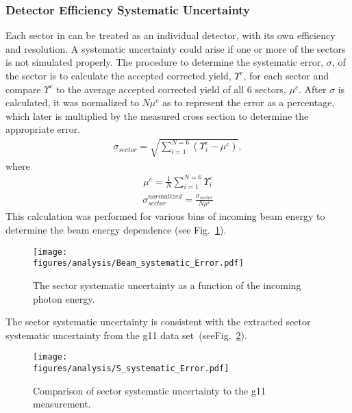 \subsubsection{Detector Efficiency Systematic Uncertainty}
Each sector in  can be treated as an individual detector, with its own efficiency and resolution. A systematic uncertainty could arise if one or more of the sectors is not simulated properly. The procedure to determine the systematic error, $\sigma$, of the sector is to calculate the accepted corrected yield, $\Upsilon^c$, for each sector and compare $\Upsilon^c$ to the average accepted corrected yield of all 6 sectors, $\mu^c$. After $\sigma$ is calculated, it was normalized to $N \mu^c$ as to represent the error as a percentage, which later is multiplied by the measured cross section to determine the appropriate error. 
\begin{align}
\sigma_{sector} = \sqrt{\sum_{i=1}^{N = 6}\left(\Upsilon_i^c - \mu^c\right)},
\end{align}
where
\begin{align}
\mu^c = \frac{1}{N}\sum_{i=1}^{N=6}\Upsilon_i^c
\end{align}
\begin{align}
\sigma_{sector}^{normalized} = \frac{\sigma_{sector}}{N\mu^c}
\end{align}
This calculation was performed for various bins of incoming beam energy to determine the beam energy dependence (see Fig.~\ref{fig:sys_sec_error}).

\begin{figure}[h!]\begin{center}
\texttt{[image: \\figures/analysis/Beam\_systematic\_Error.pdf]}
\caption[The sector systematic uncertainty as a function of the incoming photon energy]{\label{fig:sys_sec_error}The sector systematic uncertainty as a function of the incoming photon energy.}
\end{center}\end{figure}
The sector systematic uncertainty is consistent with the extracted sector systematic uncertainty from the g11 data set~\cite{williams}(seeFig.~\ref{fig:sys_sec_error.compare}).
\begin{figure}[h!]\begin{center}
\texttt{[image: \\figures/analysis/S\_systematic\_Error.pdf]}
\caption[Comparison of sector systematic uncertainty to g11 measurement]{\label{fig:sys_sec_error.compare}Comparison of sector systematic uncertainty to the g11 measurement.}
\end{center}\end{figure}
\FloatBarrier

